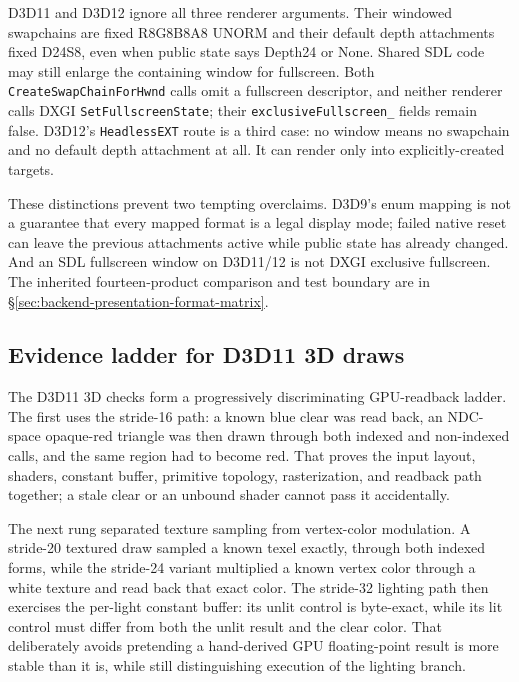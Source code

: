 D3D11 and D3D12 ignore all three renderer arguments. Their windowed swapchains are fixed
R8G8B8A8 UNORM and their default depth attachments fixed D24S8, even when public state says
Depth24 or None. Shared SDL code may still enlarge the containing window for fullscreen.
Both \texttt{CreateSwapChainForHwnd} calls omit a fullscreen descriptor, and neither renderer
calls DXGI \texttt{SetFullscreenState}; their \texttt{exclusiveFullscreen\_} fields remain false.
D3D12's \texttt{HeadlessEXT} route is a third case: no window means no swapchain and no
default depth attachment at all. It can render only into explicitly-created targets.

These distinctions prevent two tempting overclaims. D3D9's enum mapping is not a guarantee
that every mapped format is a legal display mode; failed native reset can leave the previous
attachments active while public state has already changed. And an SDL fullscreen window on
D3D11/12 is not DXGI exclusive fullscreen. The inherited fourteen-product comparison and test boundary
are in \S\ref{sec:backend-presentation-format-matrix}.

\subsection{Evidence ladder for D3D11 3D draws}

The D3D11 3D checks form a progressively discriminating GPU-readback ladder. The first uses the
stride-16  path: a known blue clear was read back, an NDC-space
opaque-red triangle was then drawn through both indexed and non-indexed calls, and the same
region had to become red.  That proves the input layout, shaders, constant buffer, primitive
topology, rasterization, and readback path together; a stale clear or an unbound shader cannot
pass it accidentally.

The next rung separated texture sampling from vertex-color modulation.  A stride-20 textured
draw sampled a known texel exactly, through both indexed forms, while the stride-24 variant
multiplied a known vertex color through a white texture and read back that exact color.  The
stride-32 lighting path then exercises the per-light constant buffer: its unlit control is
byte-exact, while its lit control must differ from both the unlit result and the clear color.
That deliberately avoids pretending a hand-derived GPU floating-point result is more stable
than it is, while still distinguishing execution of the lighting branch.

